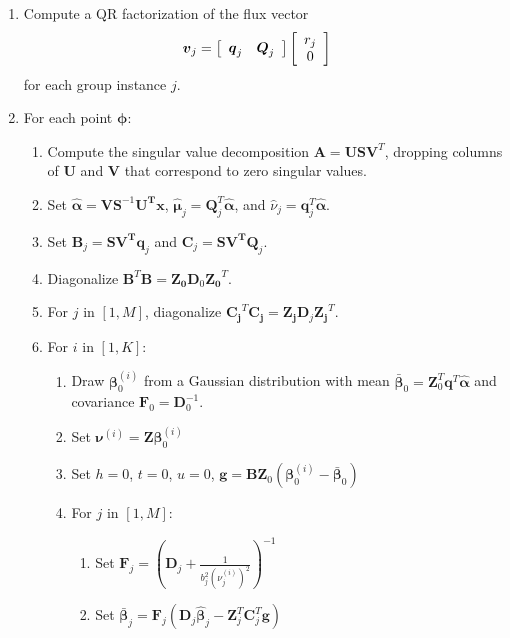 \documentclass{amsart}
\newcommand{\bm}[1]{\ensuremath{\boldsymbol{#1}}}
\begin{document}
\begin{enumerate}
\item Compute a QR factorization of the flux vector
  \begin{align*}
    \bm{v}_j &= \left[\begin{array}{ c c }
        \bm{q}_j & \bm{Q}_j
      \end{array}\right]
    \left[\begin{array}{ c }
        r_j \\
        0
      \end{array}\right]
  \end{align*}
  for each group instance $j$.
\item For each point $\bm{\phi}$:
  \begin{enumerate}
  \item Compute the singular value decomposition
    $\bm{A} = \bm{U}\bm{S}\bm{V}^T$, dropping columns of $\bm{U}$ and
    $\bm{V}$ that correspond to zero singular values.
  \item Set $\hat{\bm{\alpha}} = \bm{V}\bm{S}^{-1}\bm{U^T}\bm{x}$, 
    $\hat{\bm{\mu}}_j = \bm{Q}_j^T\hat{\bm{\alpha}}$, and
    $\hat{\nu}_j = \bm{q}_j^T\hat{\bm{\alpha}}$.
  \item Set $\bm{B}_j = \bm{S}\bm{V^T}\bm{q}_j$ and
    $\bm{C}_j = \bm{S}\bm{V^T}\bm{Q}_j$.
  \item Diagonalize $\bm{B}^T\!\bm{B}=\bm{Z_0}\bm{D}_0\bm{Z_0}^T$.
  \item For $j$ in $[1, M]$, diagonalize
    $\bm{C_j}^T\!\bm{C_j}=\bm{Z_j}\bm{D}_j\bm{Z_j}^T$.
  \item For $i$ in $[1, K]$:
    \begin{enumerate}
    \item Draw $\bm{\beta}_0^{(i)}$ from a Gaussian distribution with mean
      $\bar{\bm{\beta}}_0 = \bm{Z}^T_0\bm{q}^T\hat{\bm{\alpha}}$ and
      covariance $\bm{F}_0 = \bm{D}_0^{-1}$.
    \item Set $\bm{\nu}^{(i)} = \bm{Z}\bm{\beta}_0^{(i)}$
    \item Set $h=0$, $t=0$, $u=0$, $\bm{g}=\bm{B}\bm{Z}_0(\bm{\beta}_0^{(i)} - \bar{\bm{\beta}}_0)$
    \item For $j$ in $[1, M]$:
      \begin{enumerate}
      \item Set $\bm{F}_j = \left(\bm{D}_j+\frac{1}{b_j^2\left(\nu_j^{(i)}\right)^2}\right)^{-1}$
      \item Set $\bar{\bm{\beta}}_j =
        \bm{F}_j\left(\bm{D}_j\hat{\bm{\beta}}_j-\bm{Z}_j^T\bm{C}_j^T\bm{g}\right)$

\end{enumerate}
\end{enumerate}
\end{enumerate}
\end{enumerate}
\end{document}
